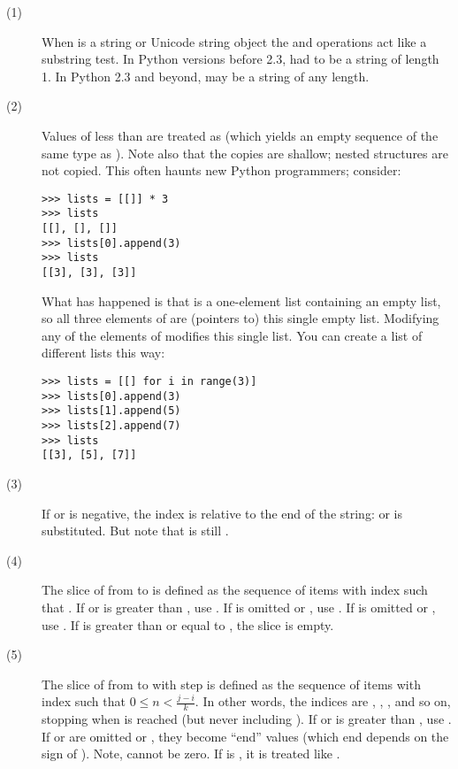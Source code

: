 \begin{description}
\item[(1)] When  is a string or Unicode string object the
 and  operations act like a substring test.  In
Python versions before 2.3,  had to be a string of length 1.
In Python 2.3 and beyond,  may be a string of any length.

\item[(2)] Values of  less than  are treated as
   (which yields an empty sequence of the same type as
  ).  Note also that the copies are shallow; nested structures
  are not copied.  This often haunts new Python programmers; consider:

\begin{verbatim}
>>> lists = [[]] * 3
>>> lists
[[], [], []]
>>> lists[0].append(3)
>>> lists
[[3], [3], [3]]
\end{verbatim}

  What has happened is that \code{[[]]} is a one-element list containing
  an empty list, so all three elements of  are (pointers to)
  this single empty list.  Modifying any of the elements of 
  modifies this single list.  You can create a list of different lists this
  way:

\begin{verbatim}
>>> lists = [[] for i in range(3)]
>>> lists[0].append(3)
>>> lists[1].append(5)
>>> lists[2].append(7)
>>> lists
[[3], [5], [7]]
\end{verbatim}

\item[(3)] If  or  is negative, the index is relative to
  the end of the string:  or
   is substituted.  But note that  is
  still .

\item[(4)] The slice of  from  to  is defined as
  the sequence of items with index  such that .  If  or  is greater than
  , use .  If  is omitted
  or , use .  If  is omitted or ,
  use .  If  is greater than or equal to ,
  the slice is empty.

\item[(5)] The slice of  from  to  with step
   is defined as the sequence of items with index 
   such that
  $0 \leq n < \frac{j-i}{k}$.  In other words, the indices
  are , , ,  and so on, stopping when
   is reached (but never including ).  If  or 
  is greater than , use .  If
   or  are omitted or , they become ``end'' values
  (which end depends on the sign of ).  Note,  cannot
  be zero. If  is , it is treated like .


\end{description}
